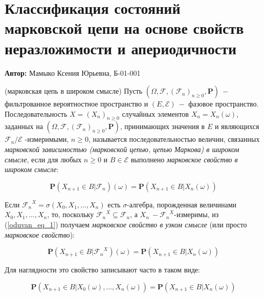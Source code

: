 

\section{Классификация состояний марковской цепи на основе свойств неразложимости и апериодичности}

\textbf{Автор:} Мамыко Ксения Юрьевна, Б-01-001

\begin{definition}\label{oduvan_def_1} (марковская цепь в широком смысле)  Пусть $(\Omega, \mathscr{F}, {(\mathscr{F}_n)}_{n \geq 0}, \mathbf{P})~-$ фильтрованное вероятностное пространство и $(E, \mathscr{E})~-$ фазовое пространство. Последовательность $X = {(X_n)}_{n \geq 0}$ случайных элементов $X_n = X_n(\omega)$, заданных на $(\Omega, \mathscr{F}, {(\mathscr{F}_n)}_{n \geq 0}, \mathbf{P})$, принимающих значения в $E$ и являющихся
$\mathscr{F}_n/\mathscr{E}$ -измеримыми, $n \geq 0$, называется последовательностью величин, связанных \emph{марковской зависимостью (марковской цепью, цепью Маркова) в широком смысле}, если для любых $n \geq 0$ и $B \in \mathscr{E}$ выполнено \emph{марковское свойство в широком смысле}:

\begin{equation}\label{oduvan_eq_1}
    \mathbf{P}(X_{n+1} \in B| \mathscr{F}_n)(\omega) = \mathbf{P}(X_{n+1} \in B| X_n(\omega))
\end{equation}

\end{definition}

Если ${\mathscr{F}_n}^X = \sigma (X_0, X_1, \ldots, X_n)$ есть $\sigma$-алгебра, порожденная величинами $X_0, X_1, \ldots, X_n$, то, поскольку ${\mathscr{F}_n}^X \subseteq \mathscr{F}_n$, а $X_n~- {\mathscr{F}_n}^X$-измеримы, из (\ref{oduvan_eq_1}) получаем \emph{марковское свойство в узком смысле} (или просто \emph{марковское свойство}):

\begin{equation}\label{oduvan_eq_2}
    \mathbf{P}(X_{n+1} \in B| {\mathscr{F}_n}^X)(\omega) = \mathbf{P}(X_{n+1} \in B| X_n(\omega)) 
\end{equation}

Для наглядности это свойство записывают часто в
таком виде:

\begin{equation}\label{oduvan_eq_3}
    \mathbf{P}(X_{n+1} \in B|X_0(\omega), \ldots, X_n(\omega)) = \mathbf{P}(X_{n+1} \in B| X_n(\omega)) 
\end{equation}

